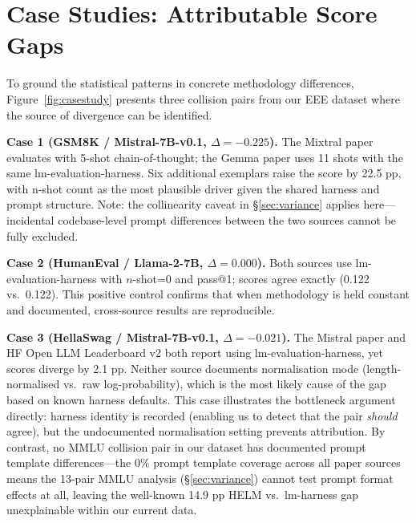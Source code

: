 \documentclass[11pt]{article}
\begin{document}
\section{Case Studies: Attributable Score Gaps}
\label{sec:casestudy}

To ground the statistical patterns in concrete methodology differences,
Figure~\ref{fig:casestudy} presents three collision pairs from our EEE
dataset where the source of divergence can be identified.

\textbf{Case 1 (GSM8K / Mistral-7B-v0.1, $\Delta = -0.225$).}
The Mixtral paper \citep{jiang-2024-mixtral} evaluates with 5-shot
chain-of-thought; the Gemma paper \citep{team-2024-gemma} uses 11 shots
with the same lm-evaluation-harness.
Six additional exemplars raise the score by 22.5 pp, with n-shot count
as the most plausible driver given the shared harness and prompt structure.
Note: the collinearity caveat in \S\ref{sec:variance} applies here---incidental
codebase-level prompt differences between the two sources cannot be fully excluded.

\textbf{Case 2 (HumanEval / Llama-2-7B, $\Delta = 0.000$).}
Both sources use lm-evaluation-harness with $n$-shot=0 and pass@1;
scores agree exactly (0.122 vs.\ 0.122).
This positive control confirms that when methodology is held constant
and documented, cross-source results are reproducible.

\textbf{Case 3 (HellaSwag / Mistral-7B-v0.1, $\Delta = -0.021$).}
The Mistral paper \citep{jiang-2023-mistral} and HF Open LLM Leaderboard v2
both report using lm-evaluation-harness, yet scores diverge by 2.1 pp.
Neither source documents normalisation mode (length-normalised vs.\ raw
log-probability), which is the most likely cause of the gap based on
known harness defaults.
This case illustrates the bottleneck argument directly: harness identity is
recorded (enabling us to detect that the pair \emph{should} agree), but the
undocumented normalisation setting prevents attribution.
By contrast, no MMLU collision pair in our dataset has documented prompt
template differences---the 0\% prompt template coverage across all paper
sources means the 13-pair MMLU analysis (\S\ref{sec:variance}) cannot test
prompt format effects at all, leaving the well-known 14.9 pp HELM vs.\
lm-harness gap \citep{alzahrani-2024-benchmarks} unexplainable within
our current data.
\end{document}
